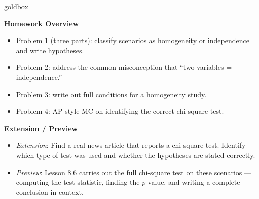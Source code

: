 \documentclass[10pt]{article}
\begin{document}
\begin{skillbox}{goldbox}
\begin{minipage}[t]{0.48\linewidth}
    \textbf{Homework Overview}
    \begin{itemize}
        \item Problem 1 (three parts): classify scenarios as homogeneity or independence
              and write hypotheses.
        \item Problem 2: address the common misconception that ``two variables = independence.''
        \item Problem 3: write out full conditions for a homogeneity study.
        \item Problem 4: AP-style MC on identifying the correct chi-square test.
    \end{itemize}
\end{minipage}
\hfill
\begin{minipage}[t]{0.48\linewidth}
    \textbf{Extension / Preview}
    \begin{itemize}
        \item \textit{Extension}: Find a real news article that reports a chi-square test.
              Identify which type of test was used and whether the hypotheses are stated
              correctly.
        \item \textit{Preview}: Lesson 8.6 carries out the full chi-square test on these
              scenarios --- computing the test statistic, finding the $p$-value, and
              writing a complete conclusion in context.
    \end{itemize}
\end{minipage}
\end{skillbox}
\end{document}
